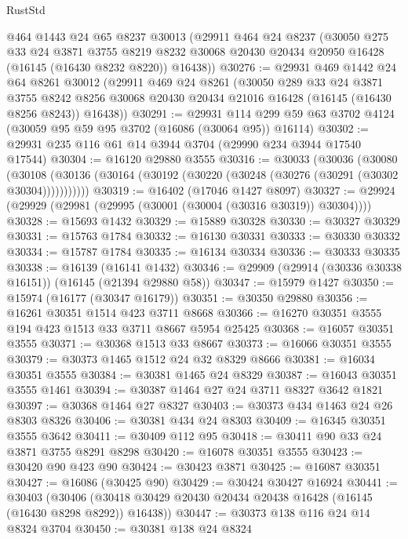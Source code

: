 \begin{lexlean}{RustStd}
\begin{coremodule}
    @464
    @1443
    @24
    @65
    @8237
    @30013
    (@29911
      @464
      @24
      @8237
      (@30050
        @275
        @33
        @24
        @3871
        @3755
        @8219
        @8232
        @30068
        @20430
        @20434
        @20950
        @16428
        (@16145 (@16430 @8232 @8220))
        @16438))
@30276 := @29931
    @469
    @1442
    @24
    @64
    @8261
    @30012
    (@29911
      @469
      @24
      @8261
      (@30050
        @289
        @33
        @24
        @3871
        @3755
        @8242
        @8256
        @30068
        @20430
        @20434
        @21016
        @16428
        (@16145 (@16430 @8256 @8243))
        @16438))
@30291 := @29931
    @114
    @299
    @59
    @63
    @3702
    @4124
    (@30059 @95 @59 @95 @3702 (@16086 (@30064 @95)) @16114)
@30302 := @29931 @235 @116 @61 @14 @3944 @3704 (@29990 @234 @3944 @17540 @17544)
@30304 := @16120 @29880 @3555
@30316 := @30033
    (@30036
      (@30080
        (@30108 (@30136 (@30164 (@30192 (@30220 (@30248 (@30276 (@30291 (@30302 @30304)))))))))))
@30319 := @16402 (@17046 @1427 @8097)
@30327 := @29924 (@29929 (@29981 (@29995 (@30001 (@30004 (@30316 @30319)) @30304))))
@30328 := @15693 @1432
@30329 := @15889 @30328
@30330 := @30327 @30329
@30331 := @15763 @1784
@30332 := @16130 @30331
@30333 := @30330 @30332
@30334 := @15787 @1784
@30335 := @16134 @30334
@30336 := @30333 @30335
@30338 := @16139 (@16141 @1432)
@30346 := @29909 (@29914 (@30336 @30338 @16151)) (@16145 (@21394 @29880 @58))
@30347 := @15979 @1427
@30350 := @15974 (@16177 (@30347 @16179))
@30351 := @30350 @29880
@30356 := @16261 @30351 @1514 @423 @3711 @8668
@30366 := @16270 @30351 @3555 @194 @423 @1513 @33 @3711 @8667 @5954 @25425
@30368 := @16057 @30351 @3555
@30371 := @30368 @1513 @33 @8667
@30373 := @16066 @30351 @3555
@30379 := @30373 @1465 @1512 @24 @32 @8329 @8666
@30381 := @16034 @30351 @3555
@30384 := @30381 @1465 @24 @8329
@30387 := @16043 @30351 @3555 @1461
@30394 := @30387 @1464 @27 @24 @3711 @8327 @3642 @1821
@30397 := @30368 @1464 @27 @8327
@30403 := @30373 @434 @1463 @24 @26 @8303 @8326
@30406 := @30381 @434 @24 @8303
@30409 := @16345 @30351 @3555 @3642
@30411 := @30409 @112 @95
@30418 := @30411 @90 @33 @24 @3871 @3755 @8291 @8298
@30420 := @16078 @30351 @3555
@30423 := @30420 @90 @423 @90
@30424 := @30423 @3871
@30425 := @16087 @30351
@30427 := @16086 (@30425 @90)
@30429 := @30424 @30427 @16924
@30441 := @30403
    (@30406 (@30418 @30429 @20430 @20434 @20438 @16428 (@16145 (@16430 @8298 @8292)) @16438))
@30447 := @30373 @138 @116 @24 @14 @8324 @3704
@30450 := @30381 @138 @24 @8324

\end{coremodule}
\end{lexlean}
